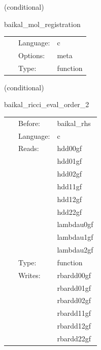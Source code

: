    (conditional) 

\hspace{5mm} baikal\_mol\_registration 

\hspace{5mm}{\it register variables for mol } 


\hspace{5mm}

 \begin{tabular*}{160mm}{cll} 
~ & Language:  & c \\ 
~ & Options:  & meta \\ 
~ & Type:  & function \\ 
\end{tabular*} 


\vspace{5mm}

   (conditional) 

\hspace{5mm} baikal\_ricci\_eval\_order\_2 

\hspace{5mm}{\it compute ricci tensor, needed for bssn rhss, at finite-differencing order 2 } 


\hspace{5mm}

 \begin{tabular*}{160mm}{cll} 
~ & Before:  & baikal\_rhs \\ 
~ & Language:  & c \\ 
~ & Reads:  & hdd00gf \\ 
~& ~ &hdd01gf\\ 
~& ~ &hdd02gf\\ 
~& ~ &hdd11gf\\ 
~& ~ &hdd12gf\\ 
~& ~ &hdd22gf\\ 
~& ~ &lambdau0gf\\ 
~& ~ &lambdau1gf\\ 
~& ~ &lambdau2gf\\ 
~ & Type:  & function \\ 
~ & Writes:  & rbardd00gf \\ 
~& ~ &rbardd01gf\\ 
~& ~ &rbardd02gf\\ 
~& ~ &rbardd11gf\\ 
~& ~ &rbardd12gf\\ 
~& ~ &rbardd22gf\\ 
\end{tabular*} 


